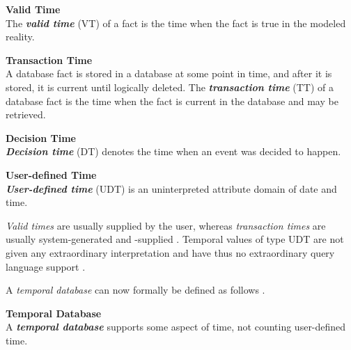 \begin{svgraybox}
\vspace{-10pt}
\begin{definition}\textbf{Valid Time}\\
The \emph{\textbf{valid time}} (VT) of a fact is the time when the fact is true in the modeled reality.
\end{definition}

\begin{definition}\textbf{Transaction Time}\\
A database fact is stored in a database at some point in time, and after it is stored, it is current until logically deleted. The \emph{\textbf{transaction time}} (TT) of a database fact is the time when the fact is current in the database and may be retrieved.
\end{definition}

\begin{definition}\textbf{Decision Time}\\
\emph{\textbf{Decision time}} (DT) denotes the time when an event was decided to happen.
\end{definition}

\begin{definition}\textbf{User-defined Time}\\
\emph{\textbf{User-defined time}} (UDT) is an uninterpreted attribute domain of date and time.
\end{definition}
\vspace{-10pt}
\end{svgraybox}

\emph{Valid times} are usually supplied by the user, whereas \emph{transaction times} are usually system-generated and -supplied \cite{Dyreson1994}. Temporal values of type UDT are not given any extraordinary interpretation and have thus no extraordinary query language support \cite{Dyreson1994}.

A \emph{temporal database} can now formally be defined as follows \cite{Dyreson1994}.

\begin{svgraybox}
\vspace{-10pt}
\begin{definition}\textbf{Temporal Database}\\
A \emph{\textbf{temporal database}} supports some aspect of time, not counting user-defined time.
\end{definition}
\vspace{-10pt}
\end{svgraybox}


